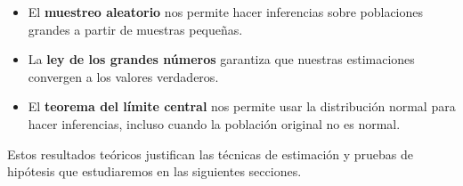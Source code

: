 \begin{itemize}
	\item El \textbf{muestreo aleatorio} nos permite hacer inferencias sobre poblaciones grandes a partir de muestras pequeñas.
	
	\item La \textbf{ley de los grandes números} garantiza que nuestras estimaciones convergen a los valores verdaderos.
	
	\item El \textbf{teorema del límite central} nos permite usar la distribución normal para hacer inferencias, incluso cuando la población original no es normal.
\end{itemize}

Estos resultados teóricos justifican las técnicas de estimación y pruebas de hipótesis que estudiaremos en las siguientes secciones.
